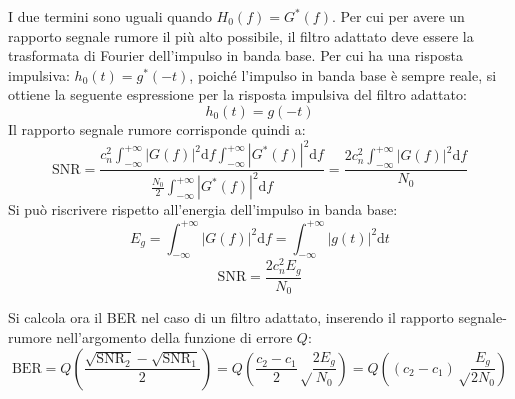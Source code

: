 \documentclass{article}
\newcommand{\df}{\mathrm{d}}
\newcommand{\intinf}{\displaystyle\int_{-\infty}^{+\infty}}
\numberwithin{equation}{subsection}
\begin{document}
I due termini sono uguali quando $H_0(f)=G^*(f)$. Per cui per avere un rapporto segnale rumore il più alto possibile, il filtro adattato deve essere la trasformata di 
Fourier dell'impulso in banda base. Per cui ha una risposta impulsiva: $h_0(t)=g^*(-t)$, poiché l'impulso in banda base è sempre reale, si ottiene la seguente espressione 
per la risposta impulsiva del filtro adattato:
\begin{equation}
    h_0(t)=g(-t)
\end{equation}
Il rapporto segnale rumore corrisponde quindi a:
\begin{equation*}
    \mathrm{SNR}=\displaystyle\frac{c_n^2\intinf |G(f)|^2\df f\intinf |G^*(f)|^2\df f}{\displaystyle\frac{N_0}{2}\intinf |G^*(f)|^2\df f}=\frac{2c_n^2\intinf |G(f)|^2\df f}{N_0}
\end{equation*}
Si può riscrivere rispetto all'energia dell'impulso in banda base:
\begin{equation*}
    E_g=\intinf |G(f)|^2\df f=\intinf |g(t)|^2\df t
\end{equation*}
\begin{equation}
    \mathrm{SNR}=\displaystyle\frac{2c_n^2E_g}{N_0}
\end{equation}

Si calcola ora il BER nel caso di un filtro adattato, inserendo il rapporto segnale-rumore nell'argomento della funzione di errore $Q$:
\begin{equation}
    \mathrm{BER}=Q\left(\displaystyle\frac{\sqrt{\mathrm{SNR}_2}-\sqrt{\mathrm{SNR}_1}}{2}\right)=Q\left(\frac{c_2-c_1}{2}\sqrt\frac{2E_g}{N_0}\right)=Q\left((c_2-c_1)\sqrt\frac{E_g}{2N_0}\right)
\end{equation}
\end{document}

